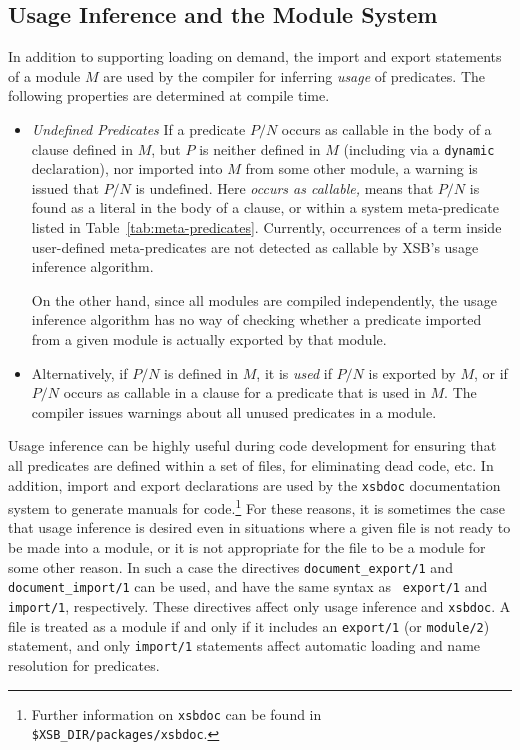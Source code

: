 \subsection{Usage Inference and the Module System} \label{sec:useinfer}
In addition to supporting loading on demand, the import and export
statements of a module $M$ are used by the compiler for inferring {\em
  usage} of predicates.  The following properties are determined at
compile time.
\begin{itemize}
\item {\em Undefined Predicates} If a predicate $P/N$ occurs as
  callable in the body of a clause defined in $M$, but $P$ is neither
  defined in $M$ (including via a {\tt dynamic} declaration), nor
  imported into $M$ from some other module, a warning is issued that
  $P/N$ is undefined.  Here {\em occurs as callable,} means that
  $P/N$ is found as a literal in the body of a clause, or within a
  system meta-predicate listed in Table~\ref{tab:meta-predicates}.
  Currently, occurrences of a term inside user-defined meta-predicates
  are not detected as callable by XSB's usage inference algorithm.

    On the other hand, since all modules are compiled independently,
    the usage inference algorithm has no way of checking whether a
    predicate imported from a given module is actually exported by
    that module.
%
\item Alternatively, if $P/N$ is defined in $M$, it is {\em used} if
  $P/N$ is exported by $M$, or if $P/N$ occurs as callable in a clause
  for a predicate that is used in $M$.  The compiler issues warnings
  about all unused predicates in a module.  
\end{itemize}

 
 Usage inference can
be highly useful during code development for ensuring that all
predicates are defined within a set of files, for eliminating dead
code, etc.  In addition, import and export declarations are used by
the {\tt xsbdoc} documentation system to generate manuals for
code.\footnote{Further information on {\tt xsbdoc} can be found in
  {\tt \$XSB\_DIR/packages/xsbdoc}.}  For these reasons, it is
sometimes the case that usage inference is desired even in situations
where a given file is not ready to be made into a module, or it is not
appropriate for the file to be a module for some other reason.  In
such a case the directives {\tt document\_export/1} and {\tt
  document\_import/1} can be used, and have the same syntax as {\tt
  export/1} and {\tt import/1}, respectively.  These directives affect
only usage inference and {\tt xsbdoc}.  A file is treated as a module
if and only if it includes an {\tt export/1} (or {\tt module/2})
  statement, and only {\tt import/1} statements affect automatic
  loading and name resolution for predicates.

